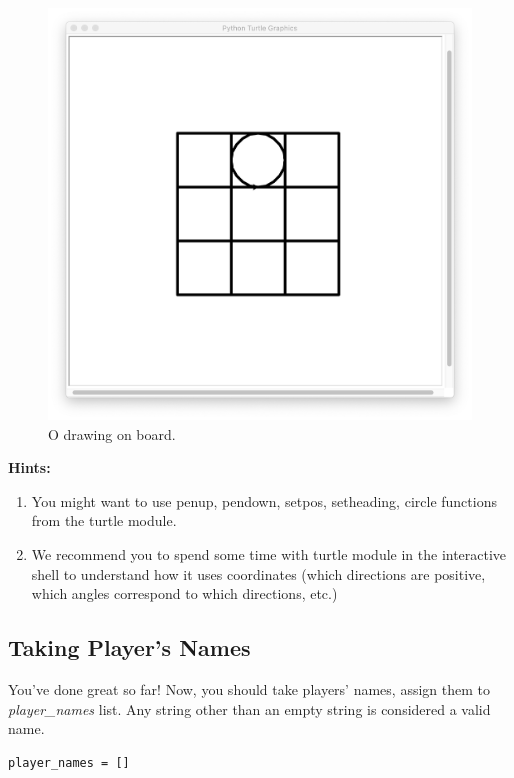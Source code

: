 \documentclass[a4paper]{article}
\begin{document}
\begin{figure}[!htb]
\centering
\includegraphics[width=1\textwidth]{o_drawing.png}
\caption{O drawing on board.}\label{fig:outputs}
\end{figure}


\textbf{Hints:}
\begin{enumerate}
\item You might want to use penup, pendown, setpos, setheading, circle functions from the turtle module.
\item We recommend you to spend some time with turtle module in the interactive shell to understand how it uses coordinates (which directions are positive, which angles correspond to which directions, etc.)
\end{enumerate}

\newpage
\subsection{Taking Player's Names}
You've done great so far! Now, you should take players' names, assign them to \textit{player\_names} list. Any string other than an empty string is considered a valid name.

\begin{lstlisting} 
player_names = []
\end{lstlisting}
\end{document}
